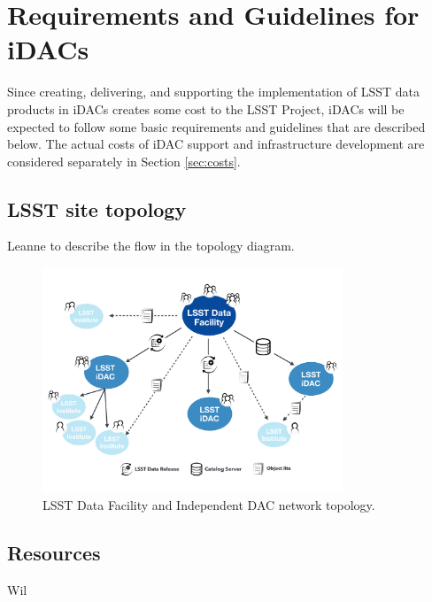 
\section{Requirements and Guidelines for iDACs}\label{sec:reqs}
Since creating, delivering, and supporting the implementation of LSST data products in iDACs creates some cost to the LSST Project, iDACs will be expected to follow some basic requirements and guidelines that are described below.
The actual costs of iDAC support and infrastructure development are considered separately in Section \ref{sec:costs}.



\subsection{LSST site topology} \label{sec:topology}

{\color{red}Leanne to describe the flow in the topology diagram.} \newline

\begin{figure}
\begin{center}
\includegraphics[width=0.8\textwidth]{images_local/LSST-site-topology}
\caption{LSST Data Facility and Independent DAC network topology.  \label{fig:lsst-site-topology}}
\end{center}
\end{figure}



\subsection{Resources}
{\color{red}Wil } \newline

